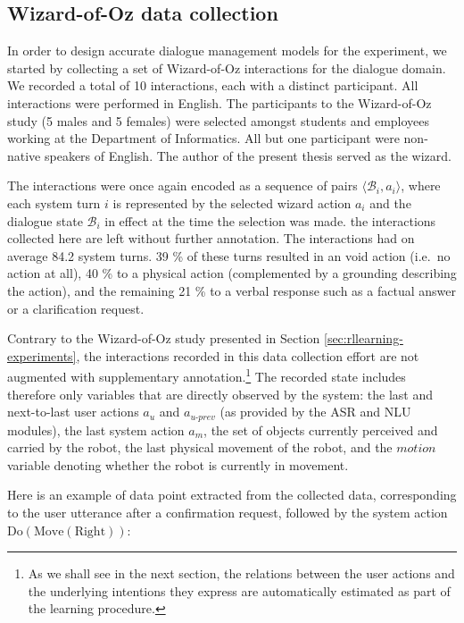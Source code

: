 \subsection{Wizard-of-Oz data collection}
\label{sec:wozcollection-exp3}

In order to design accurate dialogue management models for the experiment, we started by collecting a set of Wizard-of-Oz interactions for the dialogue domain. We recorded a total of 10 interactions, each with a distinct participant. All interactions were performed in English. The participants to the Wizard-of-Oz study (5 males and 5 females) were selected amongst students and employees working at the Department of Informatics. All but one participant were non-native speakers of English. The author of the present thesis served as the wizard.

The interactions were once again encoded as a sequence of pairs $\langle \mathcal{B}_i, a_i \rangle$, where each system turn $i$ is represented by the selected wizard action $a_i$ and the dialogue state $\mathcal{B}_i$ in effect at the time the selection was made. the interactions collected here are left without further annotation. The interactions had on average 84.2 system turns.  39 \% of these turns resulted in an void action (i.e.\ no action at all), 40 \% to a physical action (complemented by a grounding describing the action), and the remaining 21 \% to a verbal response such as a factual answer or a clarification request. 

Contrary to the Wizard-of-Oz study presented in Section \ref{sec:rllearning-experiments}, the interactions recorded in this data collection effort are not augmented with supplementary annotation.\footnote{As we shall see in the next section, the relations between the user actions and the underlying intentions they express are automatically estimated as part of the learning procedure.} The recorded state includes therefore only variables that are directly observed by the system: the last and next-to-last user actions $a_u$ and $a_{u\mbox{-}prev}$ (as provided by the ASR and NLU modules), the last system action $a_m$, the set of objects currently perceived and carried by the robot, the last physical movement of the robot, and the $\mathit{motion}$ variable denoting whether the robot is currently in movement. 

Here is an example of data point extracted from the collected data, corresponding to the user utterance  after a confirmation request, followed by the system action $\mathrm{Do(Move(Right))}$: 

